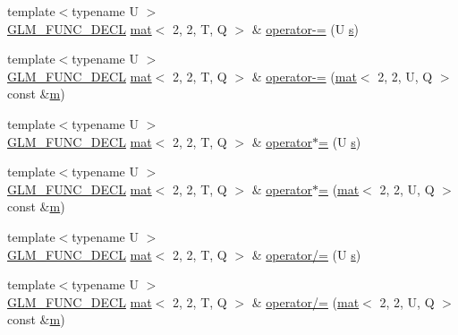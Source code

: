 \begin{DoxyCompactItemize}
\item 
{\footnotesize template$<$typename U $>$ }\\\hyperlink{setup_8hpp_ab2d052de21a70539923e9bcbf6e83a51}{G\+L\+M\+\_\+\+F\+U\+N\+C\+\_\+\+D\+E\+CL} \hyperlink{structglm_1_1mat}{mat}$<$ 2, 2, T, Q $>$ \& \hyperlink{structglm_1_1mat_3_012_00_012_00_01_t_00_01_q_01_4_aecdeb6c1dc9896a5e3245fbdf4cd55de}{operator-\/=} (U \hyperlink{_s_d_l__opengl_8h_a4af680a6c683f88ed67b76f207f2e6e4}{s})
\item 
{\footnotesize template$<$typename U $>$ }\\\hyperlink{setup_8hpp_ab2d052de21a70539923e9bcbf6e83a51}{G\+L\+M\+\_\+\+F\+U\+N\+C\+\_\+\+D\+E\+CL} \hyperlink{structglm_1_1mat}{mat}$<$ 2, 2, T, Q $>$ \& \hyperlink{structglm_1_1mat_3_012_00_012_00_01_t_00_01_q_01_4_af18719180a65a0bedb63d5f4714ceda4}{operator-\/=} (\hyperlink{structglm_1_1mat}{mat}$<$ 2, 2, U, Q $>$ const \&\hyperlink{_s_d_l__opengl__glext_8h_af593500c283bf1a787a6f947f503a5c2}{m})
\item 
{\footnotesize template$<$typename U $>$ }\\\hyperlink{setup_8hpp_ab2d052de21a70539923e9bcbf6e83a51}{G\+L\+M\+\_\+\+F\+U\+N\+C\+\_\+\+D\+E\+CL} \hyperlink{structglm_1_1mat}{mat}$<$ 2, 2, T, Q $>$ \& \hyperlink{structglm_1_1mat_3_012_00_012_00_01_t_00_01_q_01_4_a1e8b90af651add45504f00f373c747d0}{operator$\ast$=} (U \hyperlink{_s_d_l__opengl_8h_a4af680a6c683f88ed67b76f207f2e6e4}{s})
\item 
{\footnotesize template$<$typename U $>$ }\\\hyperlink{setup_8hpp_ab2d052de21a70539923e9bcbf6e83a51}{G\+L\+M\+\_\+\+F\+U\+N\+C\+\_\+\+D\+E\+CL} \hyperlink{structglm_1_1mat}{mat}$<$ 2, 2, T, Q $>$ \& \hyperlink{structglm_1_1mat_3_012_00_012_00_01_t_00_01_q_01_4_a607bdac0a14d0661db17d7400355e552}{operator$\ast$=} (\hyperlink{structglm_1_1mat}{mat}$<$ 2, 2, U, Q $>$ const \&\hyperlink{_s_d_l__opengl__glext_8h_af593500c283bf1a787a6f947f503a5c2}{m})
\item 
{\footnotesize template$<$typename U $>$ }\\\hyperlink{setup_8hpp_ab2d052de21a70539923e9bcbf6e83a51}{G\+L\+M\+\_\+\+F\+U\+N\+C\+\_\+\+D\+E\+CL} \hyperlink{structglm_1_1mat}{mat}$<$ 2, 2, T, Q $>$ \& \hyperlink{structglm_1_1mat_3_012_00_012_00_01_t_00_01_q_01_4_ab98e68a1fdc89639690e42ff6a66aa9f}{operator/=} (U \hyperlink{_s_d_l__opengl_8h_a4af680a6c683f88ed67b76f207f2e6e4}{s})
\item 
{\footnotesize template$<$typename U $>$ }\\\hyperlink{setup_8hpp_ab2d052de21a70539923e9bcbf6e83a51}{G\+L\+M\+\_\+\+F\+U\+N\+C\+\_\+\+D\+E\+CL} \hyperlink{structglm_1_1mat}{mat}$<$ 2, 2, T, Q $>$ \& \hyperlink{structglm_1_1mat_3_012_00_012_00_01_t_00_01_q_01_4_a63b8f35b3a04bd1ac0a293a41f221871}{operator/=} (\hyperlink{structglm_1_1mat}{mat}$<$ 2, 2, U, Q $>$ const \&\hyperlink{_s_d_l__opengl__glext_8h_af593500c283bf1a787a6f947f503a5c2}{m})

\end{DoxyCompactItemize}
